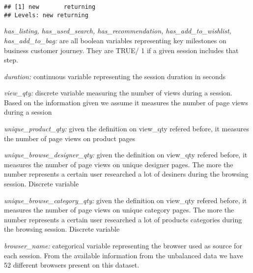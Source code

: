 \documentclass[
]{book}
\newenvironment{Shaded}{\begin{snugshade}}{\end{snugshade}}
\newcommand{\FunctionTok}[1]{\textcolor[rgb]{0.00,0.00,0.00}{#1}}
\newcommand{\NormalTok}[1]{#1}
\newcommand{\SpecialCharTok}[1]{\textcolor[rgb]{0.00,0.00,0.00}{#1}}
\begin{document}
\begin{Shaded}
\end{Shaded}

\begin{verbatim}
## [1] new       returning
## Levels: new returning
\end{verbatim}

\emph{has\_listing, has\_used\_search, has\_recommendation, has\_add\_to\_wishlist, has\_add\_to\_bag:} are all boolean variables representing key milestones on business customer journey. They are TRUE/ 1 if a given session includes that step.

\emph{duration:} continuous variable representing the session duration in seconds

\emph{view\_qty:} discrete variable measuring the number of views during a session. Based on the information given we assume it measures the number of page views during a session

\emph{unique\_product\_qty:} given the definition on view\_qty refered before, it measures the number of page views on product pages

\emph{unique\_browse\_designer\_qty:} given the definition on view\_qty refered before, it measures the number of page views on unique designer pages. The more the number represents a certain user researched a lot of desiners during the browsing session. Discrete variable

\emph{unique\_browse\_category\_qty:} given the definition on view\_qty refered before, it measures the number of page views on unique category pages. The more the number represents a certain user researched a lot of products categories during the browsing session. Discrete variable

\emph{browser\_name:} categorical variable representing the browser used as source for each session. From the available information from the unbalanced data we have 52 different browsers present on this dataset.

\begin{Shaded}
\end{Shaded}
\end{document}

